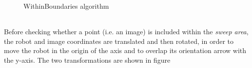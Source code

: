 \begin{figure}[htp]
\begin{center}
    \hspace*{15pt}

    \vspace*{20pt}

  \end{center}
  \caption{WithinBoundaries algorithm}
  \label{fig:withingboundaries}
\end{figure}
\\
Before checking whether a point (i.e. an image) is included 
within the \textit{sweep area}, the robot and image coordinates
are translated and then rotated, in order to move the robot in 
the origin of the axis and to overlap its orientation arrow with 
the y-axis. The two transformations are shown in figure 
